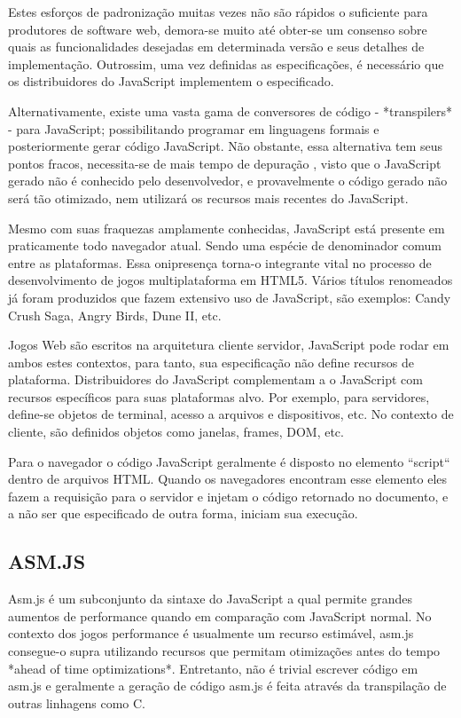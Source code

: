 \documentclass[11pt,a4paper]{article}
\begin{document}
Estes esforços de padronização muitas vezes não são rápidos
o suficiente para produtores de software web, demora-se muito até
obter-se um consenso sobre quais as funcionalidades desejadas em
determinada versão e seus detalhes de implementação. Outrossim, uma
vez definidas as especificações, é necessário que os distribuidores
do JavaScript implementem o especificado.

Alternativamente, existe uma vasta gama de conversores de código -
*transpilers* - para JavaScript; possibilitando programar em linguagens
formais e posteriormente gerar código JavaScript. Não obstante,
essa alternativa tem seus pontos fracos, necessita-se de mais tempo
de depuração , visto que o JavaScript gerado não é conhecido
pelo desenvolvedor, e provavelmente o código gerado não será tão
otimizado, nem utilizará os recursos mais recentes do JavaScript.

Mesmo com suas fraquezas amplamente conhecidas, JavaScript está
presente em praticamente todo navegador atual. Sendo uma espécie de
denominador comum entre as plataformas. Essa onipresença torna-o
integrante vital no processo de desenvolvimento de jogos multiplataforma
em HTML5. Vários títulos renomeados já foram produzidos que fazem
extensivo uso de JavaScript, são exemplos: Candy Crush Saga, Angry
Birds, Dune II, etc.

Jogos Web são escritos na arquitetura cliente servidor, JavaScript pode
rodar em ambos estes contextos, para tanto, sua especificação não
define recursos de plataforma. Distribuidores do JavaScript complementam
a o JavaScript com recursos específicos para suas plataformas alvo.
Por exemplo, para servidores, define-se objetos de terminal, acesso a
arquivos e dispositivos, etc. No contexto de cliente, são definidos
objetos como janelas, frames, DOM, etc.

Para o navegador o código JavaScript geralmente é disposto no elemento
``script`` dentro de arquivos HTML. Quando os navegadores encontram esse
elemento eles fazem a requisição para o servidor e injetam o código
retornado no documento, e a não ser que especificado de outra forma,
iniciam sua execução.

\subsection{ ASM.JS}

Asm.js é um subconjunto da sintaxe do JavaScript a qual permite grandes
aumentos de performance quando em comparação com JavaScript normal.
No contexto dos jogos performance é usualmente um recurso estimável,
asm.js consegue-o supra utilizando recursos que permitam otimizações
antes do tempo *ahead of time optimizations*. Entretanto, não é
trivial escrever código em asm.js e geralmente a geração de código
asm.js é feita através da transpilação de outras linhagens como C.
\end{document}
